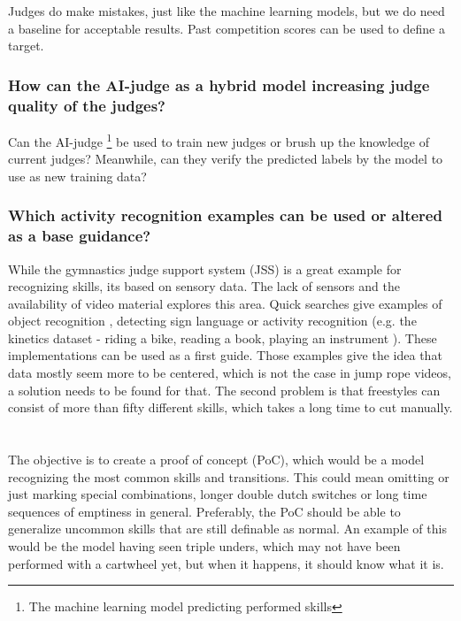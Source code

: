 Judges do make mistakes, just like the machine learning models, but we do need a baseline for acceptable results. Past competition scores can be used to define a target.

\subsubsection{How can the AI-judge as a hybrid model increasing judge quality of the judges?}
\label{subsubsec:intro-question-hybrid-model-judge-quality}
Can the AI-judge \footnote{The machine learning model predicting performed skills} be used to train new judges or brush up the knowledge of current judges? Meanwhile, can they verify the predicted labels by the model to use as new training data?

\subsubsection{Which activity recognition examples can be used or altered as a base guidance?}
\label{subsubsec:intro-question-earlier-research-guidance}

While the gymnastics judge support system (JSS) is a great example for recognizing skills, its based on sensory data. The lack of sensors and the availability of video material explores this area.
Quick searches give examples of object recognition \autocite{Diwaker_2022}, detecting sign language \autocite{Bora_2023} or activity recognition (e.g. the kinetics dataset - riding a bike, reading a book, playing an instrument \autocite{Kay_2017}).
These implementations can be used as a first guide.
Those examples give the idea that data mostly seem more to be centered, which is not the case in jump rope videos, a solution needs to be found for that. The second problem is that freestyles can consist of more than fifty different skills, which takes a long time to cut manually.

\section{}%
\label{sec:onderzoeksdoelstelling}

The objective is to create a proof of concept (PoC), which would be a model recognizing the most common skills and transitions.
This could mean omitting or just marking special combinations, longer double dutch switches or long time sequences of emptiness in general. Preferably, the PoC should be able to generalize uncommon skills that are still definable as normal. An example of this would be the model having seen triple unders, which may not have been performed with a cartwheel yet, but when it happens, it should know what it is.

